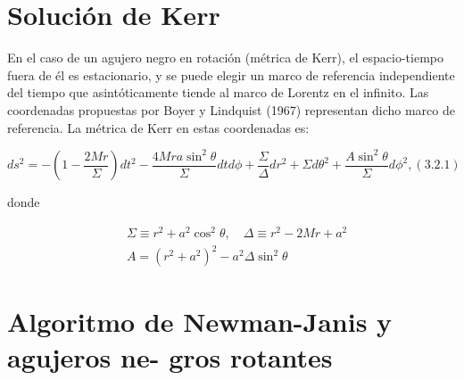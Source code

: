 \section{Solución de Kerr}
En el caso de un agujero negro en rotación (métrica de Kerr), el espacio-tiempo fuera de él es estacionario, y se puede elegir un marco de referencia independiente del tiempo que asintóticamente tiende al marco de Lorentz en el infinito. Las coordenadas propuestas por Boyer y Lindquist (1967) representan dicho marco de referencia. La métrica de Kerr en estas coordenadas es:

$$
d s^2=-\left(1-\frac{2 M r}{\Sigma}\right) d t^2-\frac{4 M r a \sin ^2 \theta}{\Sigma} d t d \phi+\frac{\Sigma}{\Delta} d r^2+\Sigma d \theta^2+\frac{A \sin ^2 \theta}{\Sigma} d \phi^2,(3.2 .1)
$$

donde

$$
\begin{aligned}
& \Sigma \equiv r^2+a^2 \cos ^2 \theta, \quad \Delta \equiv r^2-2 M r+a^2 \\
& A=\left(r^2+a^2\right)^2-a^2 \Delta \sin ^2 \theta
\end{aligned}
$$

\section{Algoritmo de Newman-Janis y agujeros ne-
gros rotantes}